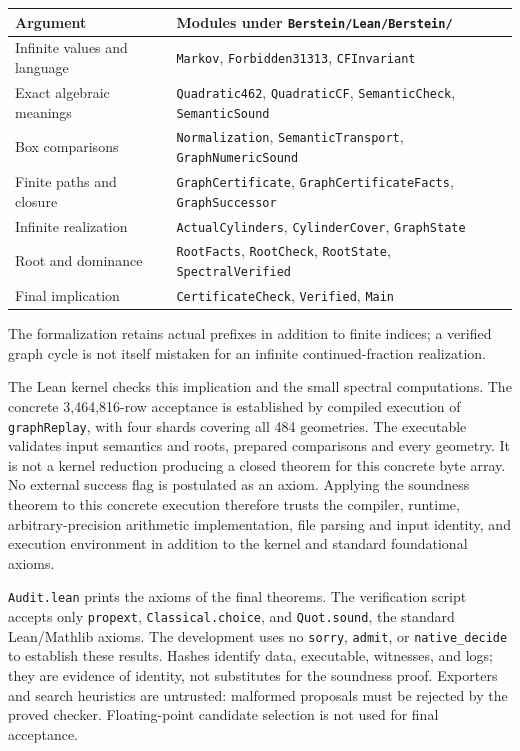 \documentclass[11pt,a4paper]{article}
\newcommand{\file}[1]{{\normalfont\small\nolinkurl{#1}}}
\begin{document}
\begin{center}\small
\begin{tabular}{p{.33\linewidth}p{.59\linewidth}}\toprule
Argument & Modules under \file{Berstein/Lean/Berstein/}\\\midrule
Infinite values and language & \file{Markov}, \file{Forbidden31313}, \file{CFInvariant}\\
Exact algebraic meanings & \file{Quadratic462}, \file{QuadraticCF}, \file{SemanticCheck}, \file{SemanticSound}\\
Box comparisons & \file{Normalization}, \file{SemanticTransport}, \file{GraphNumericSound}\\
Finite paths and closure & \file{GraphCertificate}, \file{GraphCertificateFacts}, \file{GraphSuccessor}\\
Infinite realization & \file{ActualCylinders}, \file{CylinderCover}, \file{GraphState}\\
Root and dominance & \file{RootFacts}, \file{RootCheck}, \file{RootState}, \file{SpectralVerified}\\
Final implication & \file{CertificateCheck}, \file{Verified}, \file{Main}\\\bottomrule
\end{tabular}
\end{center}
The formalization retains actual prefixes in addition to finite indices;
a verified graph cycle is not itself mistaken for an infinite
continued-fraction realization.

The Lean kernel checks this implication and the small spectral
computations. The concrete 3,464,816-row acceptance is established by
compiled execution of \file{graphReplay}, with four shards covering
all 484 geometries. The executable validates input semantics and roots,
prepared comparisons and every geometry. It is not a kernel reduction
producing a closed theorem for this concrete byte array. No external
success flag is postulated as an axiom. Applying the soundness theorem
to this concrete execution therefore trusts the compiler, runtime,
arbitrary-precision arithmetic implementation, file parsing and input
identity, and execution environment in addition to the kernel and
standard foundational axioms.

\file{Audit.lean} prints the axioms of the final theorems. The verification
script accepts only \file{propext}, \file{Classical.choice}, and
\file{Quot.sound}, the standard Lean/Mathlib axioms. The development
uses no \file{sorry}, \file{admit}, or \file{native_decide} to establish
these results. Hashes identify data, executable, witnesses, and logs;
they are evidence of identity, not substitutes for the soundness proof.
Exporters and search heuristics are untrusted: malformed proposals must
be rejected by the proved checker. Floating-point candidate selection
is not used for final acceptance.
\end{document}
